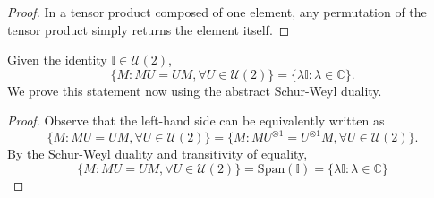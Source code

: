 \begin{proof}
    In a tensor product composed of one element, any permutation of the tensor product simply returns the element itself.
\end{proof}

\begin{theorem}
    Given the identity $\mathbb{I} \in \mathcal{U}(2)$,
    \begin{equation}
        \{M : M U = U M, \forall U \in \mathcal{U}(2) \} = \{\lambda \mathbb{I} : \lambda \in \mathbb{C} \}.
    \end{equation}
    We prove this statement now using the abstract Schur-Weyl duality.
\end{theorem}

\begin{proof}
    Observe that the left-hand side can be equivalently written as
    \begin{equation}
        \{M : MU = UM, \forall U \in \mathcal{U}(2) \} = \{M : MU^{\otimes 1} = U^{\otimes 1} M, \forall U \in \mathcal{U}(2) \}.
    \end{equation}
    By the Schur-Weyl duality and transitivity of equality,
    \begin{equation}
        \{M : MU = UM, \forall U \in \mathcal{U}(2) \} = \text{Span}(\mathbb{I}) = \{ \lambda \mathbb{I} : \lambda \in \mathbb{C} \}
    \end{equation}
\end{proof}
